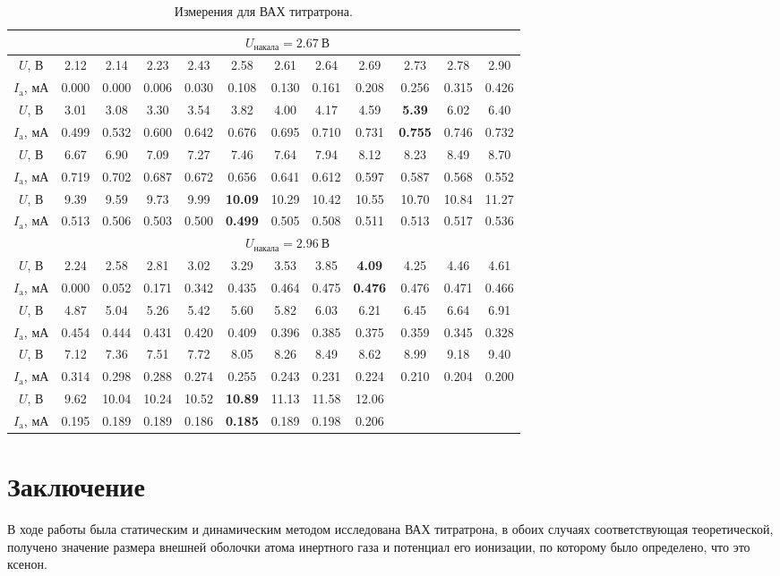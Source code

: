 \documentclass[a4paper,12pt]{article}
\begin{document}
\begin{table}[h]
\begin{tabular}{|c|c|c|c|c|c|c|c|c|c|c|c|}
\hline
                 & \multicolumn{11}{c|}{$U_\text{накала} =   2.67~\text{В}$}                             \\ \hline
$U$, В           & 2.12  & 2.14  & 2.23  & 2.43  & 2.58  & 2.61  & 2.64  & 2.69  & 2.73  & 2.78  & 2.90  \\ 
$I_\text{a}$, мА & 0.000 & 0.000 & 0.006 & 0.030 & 0.108 & 0.130 & 0.161 & 0.208 & 0.256 & 0.315 & 0.426 \\ \hline
$U$, В           & 3.01  & 3.08  & 3.30  & 3.54  & 3.82  & 4.00  & 4.17  & 4.59  & \textbf{5.39}  & 6.02  & 6.40  \\ 
$I_\text{a}$, мА & 0.499 & 0.532 & 0.600 & 0.642 & 0.676 & 0.695 & 0.710 & 0.731 & \textbf{0.755} & 0.746 & 0.732 \\ \hline
$U$, В           & 6.67  & 6.90  & 7.09  & 7.27  & 7.46  & 7.64  & 7.94  & 8.12  & 8.23  & 8.49  & 8.70  \\ 
$I_\text{a}$, мА & 0.719 & 0.702 & 0.687 & 0.672 & 0.656 & 0.641 & 0.612 & 0.597 & 0.587 & 0.568 & 0.552 \\ \hline
$U$, В           & 9.39  & 9.59  & 9.73  & 9.99  & \textbf{10.09} & 10.29 & 10.42 & 10.55 & 10.70 & 10.84 & 11.27 \\ 
$I_\text{a}$, мА & 0.513 & 0.506 & 0.503 & 0.500 & \textbf{0.499} & 0.505 & 0.508 & 0.511 & 0.513 & 0.517 & 0.536 \\ \hline
                 & \multicolumn{11}{c|}{$U_\text{накала} =   2.96~\text{В}$}                             \\ \hline
$U$, В           & 2.24  & 2.58  & 2.81  & 3.02  & 3.29  & 3.53  & 3.85  & \textbf{4.09}  & 4.25  & 4.46  & 4.61  \\ 
$I_\text{a}$, мА & 0.000 & 0.052 & 0.171 & 0.342 & 0.435 & 0.464 & 0.475 & \textbf{0.476} & 0.476 & 0.471 & 0.466 \\ \hline
$U$, В           & 4.87  & 5.04  & 5.26  & 5.42  & 5.60  & 5.82  & 6.03  & 6.21  & 6.45  & 6.64  & 6.91  \\ 
$I_\text{a}$, мА & 0.454 & 0.444 & 0.431 & 0.420 & 0.409 & 0.396 & 0.385 & 0.375 & 0.359 & 0.345 & 0.328 \\ \hline
$U$, В           & 7.12  & 7.36  & 7.51  & 7.72  & 8.05  & 8.26  & 8.49  & 8.62  & 8.99  & 9.18  & 9.40  \\ 
$I_\text{a}$, мА & 0.314 & 0.298 & 0.288 & 0.274 & 0.255 & 0.243 & 0.231 & 0.224 & 0.210 & 0.204 & 0.200 \\ \hline
$U$, В           & 9.62  & 10.04 & 10.24 & 10.52 & \textbf{10.89} & 11.13 & 11.58 & 12.06 &       &       &       \\ 
$I_\text{a}$, мА & 0.195 & 0.189 & 0.189 & 0.186 & \textbf{0.185} & 0.189 & 0.198 & 0.206 &       &       &       \\ \hline
\end{tabular}
\centering
\caption{Измерения для ВАХ титратрона.}
\end{table}
\section*{Заключение}
В ходе работы была статическим и динамическим методом исследована ВАХ титратрона, в обоих случаях соответствующая теоретической, получено значение размера внешней оболочки атома инертного газа и потенциал его ионизации, по которому было определено, что это ксенон.
\end{document}
